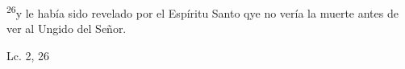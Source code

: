 \documentclass[../../rosario.tex]{subfiles}
\begin{document}
    \textsuperscript{26}y le había sido revelado por el Espíritu Santo qye no vería la muerte antes de ver al Ungido del Señor.
    \begin{flushright}
    Lc. 2, 26       
    \end{flushright}
\end{document}
